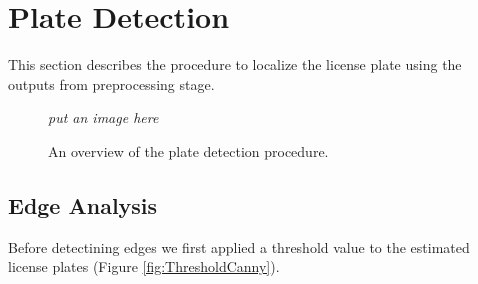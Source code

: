 \documentclass{standalone}
\begin{document}
\section{Plate Detection}
This section describes the procedure to localize the license plate using the outputs from preprocessing stage. 

\begin{figure} 
	\centering    
	{\it put an image here }
	\caption{An overview of the plate detection procedure.} 
	\label{fig:DetectionMethod}
\end{figure}

\subsection{Edge Analysis}
Before detectining edges we first applied a threshold value to the estimated license plates (Figure \ref{fig:ThresholdCanny}).
\end{document}
